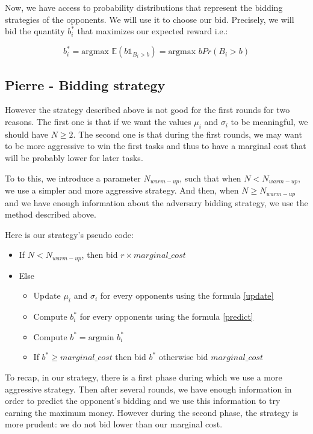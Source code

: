 \documentclass[11pt]{article}
\begin{document}
Now, we have access to probability distributions that represent the bidding strategies of the opponents. We will use it to choose our bid. Precisely, we will bid the quantity $b^*_i$ that maximizes our expected reward i.e.:

\begin{equation}
b^*_i = \text{argmax }\mathbb{E}(b\mathds{1}_{B_i > b}) = \text{argmax }bPr(B_i > b)
\label{predict}
\end{equation}

\subsection{Pierre - Bidding strategy}

However the strategy described above is not good for the first rounds for two reasons. The first one is that if we want the values $\mu_i$ and $\sigma_i$ to be meaningful, we should have $N \geq 2$. The second one is that during the first rounds, we may want to be more aggressive to win the first tasks and thus to have a marginal cost that will be probably lower for later tasks.

To to this, we introduce a parameter $N_{warm-up}$, such that when $N < N_{warm-up}$, we use a simpler and more aggressive strategy. And then, when $N \geq N_{warm-up}$ and we have enough information about the adversary bidding strategy, we use the method described above.

Here is our strategy's pseudo code:
\begin{itemize}
\item If $N < N_{warm-up}$, then bid $r \times marginal\_cost$
\item Else
\begin{itemize}
	\item Update $\mu_i$ and $\sigma_i$ for every opponents using the formula \ref{update}
	\item Compute $b^*_i$ for every opponents using the formula \ref{predict}
	\item Compute $b^* = \text{argmin } b^*_i$
	\item If $b^* \geq marginal\_cost$ then bid $b^*$ otherwise bid $marginal\_cost$
\end{itemize}
\end{itemize}

To recap, in our strategy, there is a first phase during which we use a more aggressive strategy. Then after several rounds, we have enough information in order to predict the opponent's bidding and we use this information to try earning the maximum money. However during the second phase, the strategy is more prudent: we do not bid lower than our marginal cost.
\end{document}
